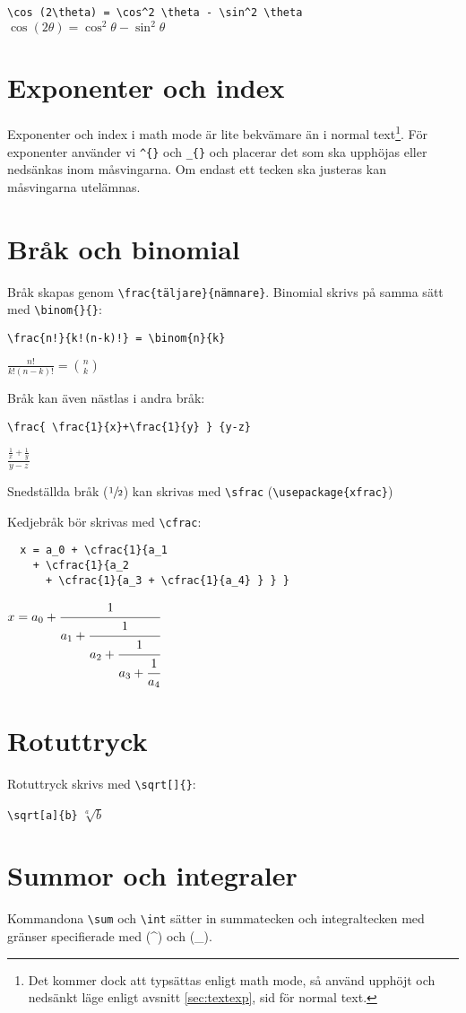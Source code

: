 \verb+\cos (2\theta) = \cos^2 \theta - \sin^2 \theta+
$\cos (2\theta) = \cos^2 \theta - \sin^2 \theta$

\section{Exponenter och index}\label{sec:mathexp}
Exponenter och index i math mode är lite bekvämare än i normal text\footnote{Det kommer dock att typsättas enligt math mode, så använd upphöjt och nedsänkt läge enligt avsnitt \ref{sec:textexp}, sid \pageref{sec:textexp} för normal text.}. För exponenter använder vi \verb+^{}+ och \verb+_{}+ och placerar det som ska upphöjas eller nedsänkas inom måsvingarna. Om endast ett tecken ska justeras kan måsvingarna utelämnas.

\section{Bråk och binomial}
Bråk skapas genom \verb+\frac{täljare}{nämnare}+. Binomial skrivs på samma sätt med \verb+\binom{}{}+:

\verb+\frac{n!}{k!(n-k)!} = \binom{n}{k}+

$\frac{n!}{k!(n-k)!} = \binom{n}{k}$

Bråk kan även nästlas i andra bråk:

\verb?\frac{ \frac{1}{x}+\frac{1}{y} } {y-z}?

$\frac{\frac{1}{x}+\frac{1}{y}}{y-z}$

Snedställda bråk ($\sfrac{1}{2}$) kan skrivas med \verb+\sfrac+ (\verb+\usepackage{xfrac}+)

Kedjebråk bör skrivas med \verb+\cfrac+:

\begin{verbatim}
  x = a_0 + \cfrac{1}{a_1
    + \cfrac{1}{a_2
      + \cfrac{1}{a_3 + \cfrac{1}{a_4} } } }
\end{verbatim}

$  x = a_0 + \cfrac{1}{a_1
    + \cfrac{1}{a_2
      + \cfrac{1}{a_3 + \cfrac{1}{a_4} } } }$

\section{Rotuttryck}
Rotuttryck skrivs med \verb+\sqrt[]{}+:

\verb+\sqrt[a]{b}+ {\Large\quad$\sqrt[a]{b}$}

\section{Summor och integraler}
Kommandona \verb+\sum+ och \verb+\int+ sätter in summatecken och integraltecken med gränser specifierade med (\textasciicircum) och (\_).

